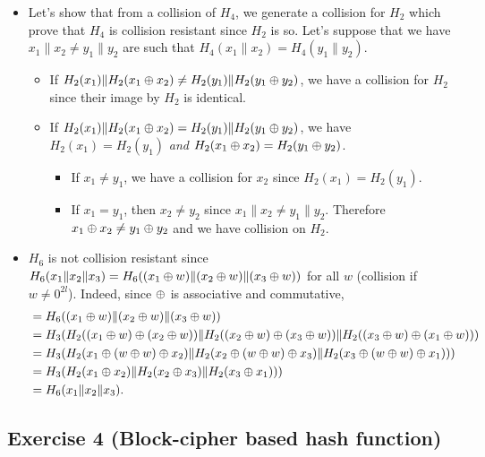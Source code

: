 \begin{solution}
	\begin{itemize}
		\item
		Let's show that from a collision of $H_4$, we generate a collision for $H_2$
		which prove that $H_4$ is collision resistant since $H_2$ is so.
		Let's suppose that we have $x_1\|x_2 \neq y_1\|y_2$ are such that $H_4(x_1\|x_2) = H_4(y_1\|y_2)$.
		\begin{itemize}
			\item
			If $H_2(x_1) \| H_2(x_1 \oplus x_2) \neq H_2(y_1) \| H_2(y_1 \oplus y_2)$,
			we have a collision for $H_2$ since their image by $H_2$ is identical.
			\item
			If $H_2(x_1) \| H_2(x_1 \oplus x_2) = H_2(y_1) \| H_2(y_1 \oplus y_2)$,
			we have $H_2(x_1) = H_2(y_1)$ \emph{and} $H_2(x_1 \oplus x_2) = H_2(y_1 \oplus y_2)$.
			\begin{itemize}
				\item If $x_1 \neq y_1$, we have a collision for $x_2$ since $H_2(x_1) = H_2(y_1)$.
				\item If $x_1 = y_1$, then $x_2 \neq y_2$ since $x_1\|x_2 \neq y_1\|y_2$.
				Therefore $x_1 \oplus x_2 \neq y_1 \oplus y_2$ and we have collision on $H_2$.
			\end{itemize}
		\end{itemize}
		\item
		$H_6$ is not collision resistant since $H_6(x_1\|x_2\|x_3) = H_6((x_1 \oplus w)\|(x_2 \oplus w)\|(x_3 \oplus w))$
		for all $w$ (collision if $w\neq 0^{2l}$).
		Indeed, since $\oplus$ is associative and commutative,
		\begin{align*}
		& = H_6((x_1 \oplus w)\|(x_2 \oplus w)\|(x_3 \oplus w))\\
		& = H_3(H_2((x_1 \oplus w) \oplus (x_2 \oplus w))\|H_2((x_2 \oplus w) \oplus (x_3 \oplus w))\|H_2((x_3 \oplus w) \oplus (x_1 \oplus w)))\\
		& = H_3(H_2(x_1 \oplus (w \oplus w) \oplus x_2)\|H_2(x_2 \oplus (w \oplus w) \oplus x_3)\|H_2(x_3 \oplus (w \oplus w) \oplus x_1)))\\
		& = H_3(H_2(x_1 \oplus x_2)\|H_2(x_2 \oplus x_3)\|H_2(x_3 \oplus x_1)))\\
		& = H_6(x_1\|x_2\|x_3).
		\end{align*}
	\end{itemize}
\end{solution}



\subsection{Exercise 4 (Block-cipher based hash function)}

